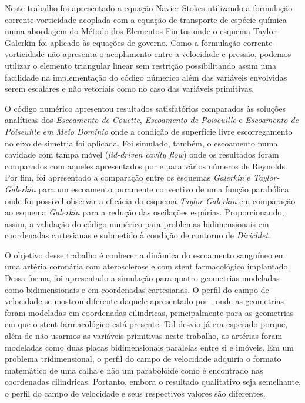 Neste trabalho foi apresentado a equação Navier-Stokes
utilizando a formulação corrente-vorticidade acoplada
com a equação de transporte de espécie química numa abordagem
do Método dos Elementos Finitos onde o esquema Taylor-Galerkin
foi aplicado às equações de governo. Como a formulação corrente-vorticidade
não apresenta o acoplamento entre a velocidade e pressão,
podemos utilizar o elemento triangular linear sem restrição
possibilitando assim uma facilidade na implementação do código
númerico além das variáveis envolvidas serem escalares e não vetoriais
como no caso das variáveis primitivas.

\medskip
O código numérico apresentou
resultados satisfatórios comparados às soluções analíticas dos
\textit{Escoamento de Couette}, \textit{Escoamento de Poiseuille}
e \textit{Escoamento de Poiseuille em Meio Domínio} onde a condição
de superfície livre escorregamento no eixo de simetria foi aplicada.
Foi simulado, também, o escoamento numa cavidade com tampa móvel (\textit{lid-driven cavity flow})
onde os resultados foram comparados com aqueles apresentados por \cite{ghia1982} e \cite{marchi2009}
para vários números de Reynolds. 
Por fim, foi apresentado a comparação
entre os esquemas \textit{Galerkin} e \textit{Taylor-Galerkin} para um
escoamento puramente convectivo de uma função parabólica onde foi
possível observar a eficácia do esquema \textit{Taylor-Galerkin} 
em comparação ao esquema \textit{Galerkin} para a redução das
oscilações espúrias. Proporcionando, assim, a validação do código numérico
para problemas bidimensionais em coordenadas cartesianas e submetido à condição de contorno de
\textit{Dirichlet}.

\medskip
O objetivo desse trabalho é conhecer a dinâmica do escoamento
sanguíneo em uma artéria coronária com aterosclerose e com 
stent farmacológico implantado. Dessa forma, foi apresentado a simulação
para quatro geometrias modeladas como bidimensionais e
em coordenadas cartesianas. O perfil do campo de velocidade
se mostrou diferente daquele apresentado por \cite{wang2017},
onde as geometrias foram modeladas em coordenadas cilindricas,
principalmente para as geometrias em que o stent farmacológico
está presente. Tal desvio já era esperado porque, além de não usarmos
as variáveis primitivas neste trabalho, as artérias foram modeladas
como duas placas bidimensionais paralelas entre si e imóveis.
Em um problema tridimensional, o perfil do campo de velocidade
adquiria o formato matemático de uma calha e não um parabolóide
como é encontrado nas coordenadas cilindricas. Portanto, embora
o resultado qualitativo seja semelhante, o perfil do campo
de velocidade e seus respectivos valores são diferentes.

